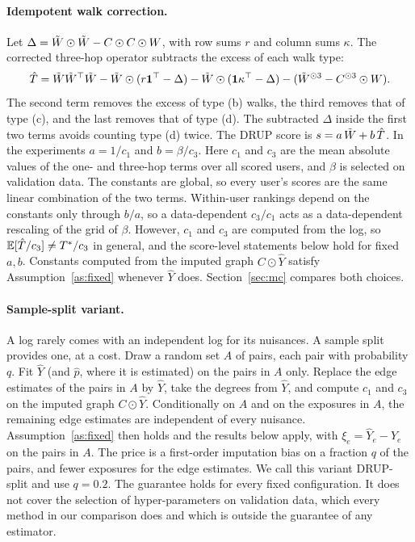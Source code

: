 \paragraph{Idempotent walk correction.}
Let $\Delta=\tilde W\odot\tilde W-C\odot C\odot W$, with row sums $r$ and column sums
$\kappa$. The corrected three-hop operator subtracts the excess of each walk
type:
\begin{equation}\label{eq:drup}
\hat T=\tilde W\tilde W^\top\tilde W-\tilde W\odot(r\mathbf 1^\top-\Delta)-\tilde W\odot(\mathbf 1\kappa^\top-\Delta)
-(\tilde W^{\odot3}-C^{\odot3}\odot W).
\end{equation}
The second term removes the excess of type (b) walks, the third removes that of
type (c), and the last removes that of type (d). The subtracted $\Delta$ inside
the first two terms avoids counting type (d) twice. The DRUP score is
$s=a\,\tilde W+b\,\hat T$.
In the experiments $a=1/c_1$ and $b=\beta/c_3$. Here $c_1$ and $c_3$ are the
mean absolute values of the one- and three-hop terms over all scored users, and
$\beta$ is selected on validation data. The constants are global, so every
user's scores are the same linear combination of the two terms. Within-user
rankings depend on the constants only through $b/a$, so a data-dependent
$c_3/c_1$ acts as a data-dependent rescaling of the grid of $\beta$.
However, $c_1$ and $c_3$ are computed from the log, so
$\mathbb{E}[\hat T/c_3]\neq T^*/c_3$ in general, and the score-level statements below
hold for fixed $a,b$. Constants computed from the imputed graph $C\odot\hat Y$
satisfy Assumption~\ref{as:fixed} whenever $\hat Y$ does. Section~\ref{sec:mc}
compares both choices.

\paragraph{Sample-split variant.}
A log rarely comes with an independent log for its nuisances. A sample split
provides one, at a cost. Draw a random set $A$ of pairs, each pair with
probability $q$. Fit $\hat Y$ (and $\hat p$, where it is estimated) on the
pairs in $A$ only. Replace
the edge estimates of the pairs in $A$ by $\hat Y$, take the degrees from
$\hat Y$, and compute $c_1$ and $c_3$ on the imputed graph $C\odot\hat Y$.
Conditionally on $A$ and on the exposures in $A$, the remaining edge estimates
are independent of every nuisance. Assumption~\ref{as:fixed} then holds and the
results below apply, with $\xi_e=\hat Y_e-Y_e$ on the pairs in $A$. The price
is a first-order imputation bias on a fraction $q$ of the pairs, and fewer
exposures for the edge estimates. We call this variant DRUP-split and use
$q=0.2$. The guarantee holds for every fixed configuration. It does not cover
the selection of hyper-parameters on validation data, which every method in our
comparison does and which is outside the guarantee of any estimator.

